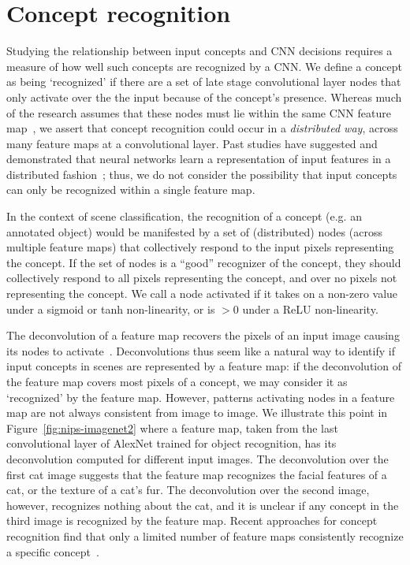 \documentclass{article}
\begin{document}
\section{Concept recognition}
\label{sec:concept_recognition}
Studying the relationship between input concepts and CNN decisions requires a measure of how
well such concepts are recognized by a CNN. 
We define a concept as being `recognized' if there are a set of late stage convolutional layer nodes 
that only activate over the the input because of the concept's presence.
Whereas much of the research assumes that these nodes must lie within
the same CNN feature map~\citep{bau2017network,zintgraf2017visualizing}, we assert that 
concept recognition could occur in a {\em distributed way}, across many feature maps at a 
convolutional layer. Past studies have suggested and demonstrated that 
neural networks learn a representation of input features in a distributed 
fashion~\citep{carpenter1988art,bengio2003neural,hinton1986learning};
thus, we do not consider the possibility that input concepts can only be recognized within a single feature map. 

In the context of scene classification, the recognition of a 
concept (e.g. an annotated object) would be manifested by a set of (distributed) nodes 
(across multiple feature maps)
that collectively respond to the input pixels representing the concept. 
If the set of nodes is a ``good'' recognizer of the concept, they should
collectively respond to all pixels representing the concept, and over
no pixels not representing the concept. We call a node activated if it takes
on a non-zero value under a sigmoid or tanh non-linearity, or is $> 0$ under a ReLU non-linearity. 

The deconvolution of a feature map recovers the pixels of an input image causing
its nodes to activate~\citep{zeiler2014visualizing,zeiler2011adaptive,yosinski2015understanding}. 
Deconvolutions thus seem like a natural way to identify if input concepts in scenes 
are represented by a feature map: if the deconvolution of the feature map covers most pixels of a concept, 
we may consider it as `recognized' by the feature map. However, patterns activating nodes in a feature
map are not always consistent from image to image. 
We illustrate this point in Figure~\ref{fig:nips-imagenet2} where
a feature map, taken from the last convolutional layer of AlexNet trained for object recognition, 
has its deconvolution computed for different input images. The deconvolution over the first
cat image suggests that the feature map recognizes
the facial features of a cat, or the
texture of a cat's fur. The deconvolution over the
second image, however, recognizes nothing about the
cat, and it is unclear if any concept in the
third image is recognized by the feature map. Recent 
approaches for concept recognition 
find that only a limited number of feature maps consistently 
recognize a specific concept~\citep{bau2017network}.
\end{document}
